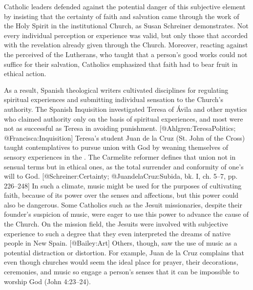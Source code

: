 Catholic leaders defended against the potential danger of this subjective element by insisting that the certainty of faith and salvation came through the work of the Holy Spirit in the institutional Church, as Susan Schreiner demonstrates.
\Autocite[131--208]{Schreiner:Certainty}
Not every individual perception or experience was valid, but only those that accorded with the revelation already given through the Church.
Moreover, reacting against the perceived  of the Lutherans, who taught that a person's good works could not suffice for their salvation, Catholics emphasized that faith had to bear fruit in ethical action.

As a result, Spanish theological writers cultivated disciplines for regulating spiritual experiences and submitting individual sensation to the Church's authority.
The Spanish Inquisition investigated Teresa of Ávila and other mystics who claimed authority only on the basis of spiritual experiences, and most were not as successful as Teresa in avoiding punishment.
[@Ahlgren:TeresaPolitics; @Francisca:Inquisition]
Teresa's student Juan de la Cruz (St. John of the Cross) taught contemplatives to pursue union with God by weaning themselves of sensory experiences in the .
The Carmelite reformer defines that union not in sensual terms but in ethical ones, as the total surrender and conformity of one's will to God.
[@Schreiner:Certainty; @JuandelaCruz:Subida, bk. I, ch. 5--7, pp. 226--248]
\Autocite[ch. 6]{Schreiner:Certainty}
In such a climate, music might be used for the purposes of cultivating faith, because of its power over the senses and affections, but this power could also be dangerous.
Some Catholics such as the Jesuit missionaries, despite their founder's suspicion of music, were eager to use this power to advance the cause of the Church.
On the mission field, the Jesuits were involved with subjective experience to such a degree that they even interpreted the dreams of native people in New Spain.
[@Bailey:Art]
Others, though, saw the use of music as a potential distraction or distortion.
For example, Juan de la Cruz complains that even though churches would seem the ideal place for prayer, their decorations, ceremonies, and music so engage a person's senses that it can be impossible to worship God  (John 4:23--24).
\Autocite[bk. 3, ch. 39--45, pp. 415--424]{JuandelaCruz:Subida}

